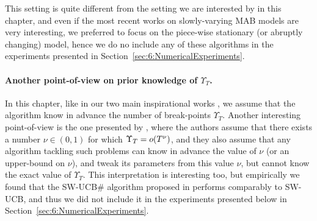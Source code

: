 This setting is quite different from the setting we are interested by in this chapter, and even if the most recent works on slowly-varying MAB models are very interesting, we preferred to focus on the piece-wise stationary (or abruptly changing) model,
hence we do no include any of these algorithms in the experiments presented in Section~\ref{sec:6:NumericalExperiments}.


\paragraph{Another point-of-view on prior knowledge of $\Upsilon_T$.}
%
In this chapter, like in our two main inspirational works \cite{CaoZhenKvetonXie18,LiuLeeShroff17},
we assume that the algorithm know in advance the number of break-points $\Upsilon_T$.
Another interesting point-of-view is the one presented by \cite{WeiSrivastava18Abruptly,WeiSrivastava18Distributed},
where the authors assume that there exists a number $\nu\in(0,1)$ for which $\Upsilon_T = \mathop{}\mathopen{}o\mathopen{}\left(T^{\nu}\right)$,
and they also assume that any algorithm tackling such problems can know in advance the value of $\nu$ (or an upper-bound on $\nu$), and tweak its parameters from this value $\nu$, but cannot know the exact value of $\Upsilon_T$.
%
This interpretation is interesting too,
but empirically we found that the SW-UCB\# algorithm proposed in \cite{WeiSrivastava18Abruptly} performs comparably to SW-UCB, and thus we did not include it in the experiments presented below in Section~\ref{sec:6:NumericalExperiments}.
%


